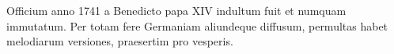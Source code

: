 Officium anno 1741 a Benedicto papa XIV indultum fuit et
numquam
immutatum.
Per totam fere Germaniam aliundeque diffusum, permultas habet
melodiarum versiones, praesertim pro vesperis.
